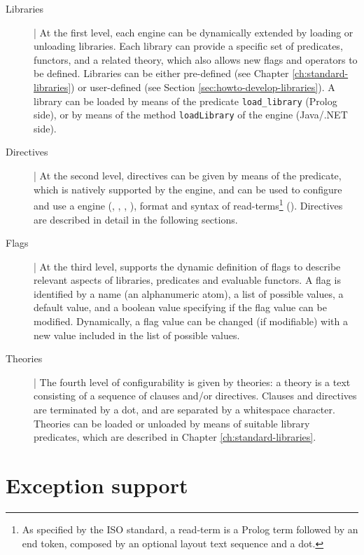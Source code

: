 \begin{description}

\item[Libraries] |
At the first level, each \tuprolog{} engine can be dynamically extended by loading or unloading libraries.
%
Each library can provide a specific set of predicates, functors, and a related theory, which also allows new flags and operators to be defined.
%
Libraries can be either pre-defined (see Chapter \ref{ch:standard-libraries}) or user-defined (see Section \ref{sec:howto-develop-libraries}).
%
A library can be loaded by means of the predicate \texttt{load\_library} (Prolog side), or by means of the method \texttt{loadLibrary} of the \tuprolog{} engine (Java/.NET side).


\item[Directives] |
At the second level, directives can be given by means of the  predicate, which is natively supported by the engine, and can be used to configure and use a \tuprolog{} engine (, , , ), format and syntax of read-terms\footnote{As specified by the ISO standard, a read-term is a Prolog term followed by an end token, composed by an optional layout text sequence and a dot.} ().
%
Directives are described in detail in the following sections.

\item[Flags] |
At the third level, \tuprolog{} supports the dynamic definition of flags to describe relevant aspects of libraries, predicates and evaluable functors.
%
A flag is identified by a name (an alphanumeric atom), a list of possible values, a default value, and a boolean value specifying if the flag value can be modified.
%
Dynamically, a flag value can be changed (if modifiable) with a new value included in the list of possible values.

\item[Theories] |
The fourth level of configurability is given by theories: a theory is a text consisting of a sequence of clauses and/or directives.
%
Clauses and directives are terminated by a dot, and are separated by a whitespace character.
%
Theories can be loaded or unloaded by means of suitable library predicates, which are described in Chapter \ref{ch:standard-libraries}.

\end{description}

\section{Exception support}
\label{sec:exception-support}

